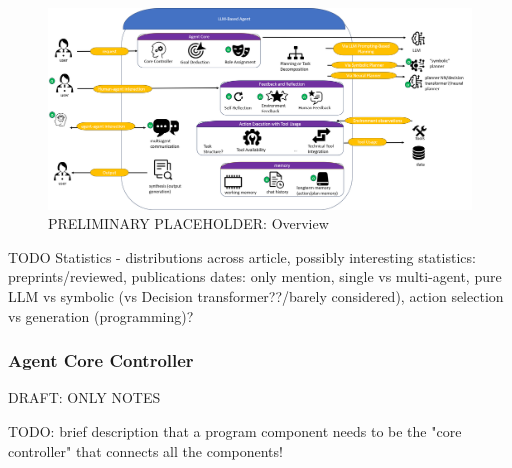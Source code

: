 \documentclass{article}
\begin{document}

\begin{figure}[h]
	\centering
	\includegraphics[width=1.0\linewidth]{LLMAgentOverview}
	\caption{PRELIMINARY PLACEHOLDER: Overview}
	\label{fig:llmagentoverview}
\end{figure}

TODO Statistics - distributions across article, 
possibly interesting statistics: preprints/reviewed, publications dates: only mention, single vs multi-agent, pure LLM vs symbolic (vs Decision transformer??/barely considered), action selection vs generation (programming)?

\subsubsection{Agent Core Controller}
DRAFT: ONLY NOTES

TODO: brief description that a program component needs to be the "core controller" that connects all the components!
\end{document}
